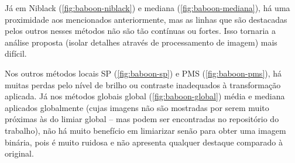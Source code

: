 \documentclass[brazilian,a4paper,twocolumn]{article}
\begin{document}
        Já em Niblack (\cref{fig:baboon-niblack}) e mediana (\cref{fig:baboon-mediana}), há uma proximidade aos mencionados anteriormente, mas as linhas que são destacadas pelos outros nesses métodos não são tão contínuas ou fortes. Isso tornaria a análise proposta (isolar detalhes através de processamento de imagem) mais difícil.

        Nos outros métodos locais SP (\cref{fig:baboon-sp}) e PMS (\cref{fig:baboon-pms}), há muitas perdas pelo nível de brilho ou contraste inadequados à transformação aplicada. Já nos métodos globais global (\cref{fig:baboon-global}) média e mediana aplicados globalmente (cujas imagens não são mostradas por serem muito próximas às do limiar global -- mas podem ser encontradas no repositório do trabalho), não há muito benefício em limiarizar senão para obter uma imagem binária, pois é muito ruidosa e não apresenta qualquer destaque comparado à original.
\end{document}
